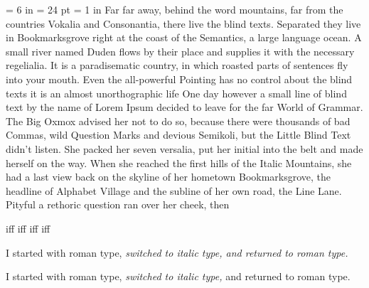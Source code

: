 {
\hsize = 6 in
\parindent = 24 pt
\leftskip = 1 in
 Far far away, behind the word mountains, far from the countries Vokalia and Consonantia, 
there live the blind texts. Separated they live in Bookmarksgrove right at the coast of 
the Semantics, a large language ocean. A small river named Duden flows by their place and 
supplies it with the necessary regelialia. It is a paradisematic country, in which roasted 
parts of sentences fly into your mouth. Even the all-powerful Pointing has no control about 
the blind texts it is an almost unorthographic life One day however a small line of blind text 
by the name of Lorem Ipsum decided to leave for the far World of Grammar. The Big Oxmox advised 
her not to do so, because there were thousands of bad Commas, wild Question Marks and devious Semikoli,
but the Little Blind Text didn’t listen. She packed her seven versalia, put her initial into the belt 
and made herself on the way. When she reached the first hills of the Italic Mountains, she had a 
last view back on the skyline of her hometown Bookmarksgrove, the headline of Alphabet Village and 
the subline of her own road, the Line Lane. Pityful a rethoric question ran over her cheek, then 
}

iff i{ff} {i}ff i{f}f

I started with roman type, \it switched to italic type, \rm and returned to roman type.

I started with roman type, {\it switched to italic type,} and returned to roman type.
\bye
